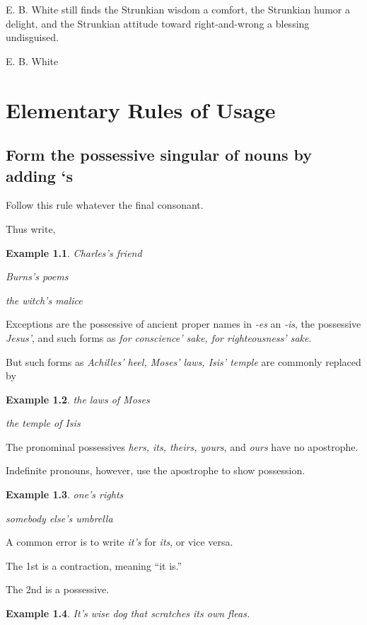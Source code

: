 \documentclass{book}
\numberwithin{equation}{section}
\newtheorem{example}{Example}[chapter]
\begin{document}
E. B. White still finds the Strunkian wisdom a comfort, the Strunkian humor a delight, and the Strunkian attitude toward right-and-wrong a blessing undisguised.

\begin{flushright}
    E. B. White
\end{flushright}


\chapter{Elementary Rules of Usage}

\section{Form the possessive singular of nouns by adding `s}
Follow this rule whatever the final consonant.

Thus write,
\begin{example}
    Charles's friend
    
    Burns's poems
    
    the witch's malice
\end{example}
Exceptions are the possessive of ancient proper names in \textit{-es} an \textit{-is}, the possessive \textit{Jesus'}, and such forms as \textit{for conscience' sake, for righteousness' sake}.

But such forms as \textit{Achilles' heel, Moses' laws, Isis' temple} are commonly replaced by
\begin{example}
    the laws of Moses
    
    the temple of Isis
\end{example}
The pronominal possessives \textit{hers, its, theirs, yours}, and \textit{ours} have no apostrophe.

Indefinite pronouns, however, use the apostrophe to show possession.
\begin{example}
    one's rights
    
    somebody else's umbrella
\end{example}
A common error is to write \textit{it's} for \textit{its}, or vice versa.

The 1st is a contraction, meaning ``it is.''

The 2nd is a possessive.
\begin{example}
    It's wise dog that scratches its own fleas.
\end{example}
\end{document}
